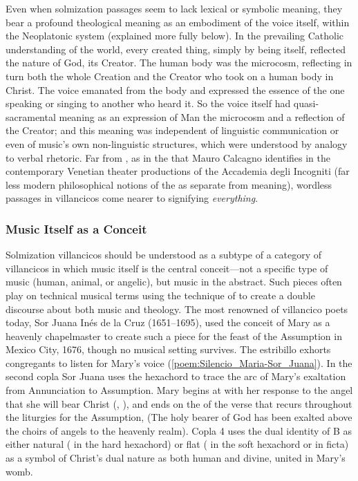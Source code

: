 Even when solmization passages seem to lack lexical or symbolic meaning, they
bear a profound theological meaning as an embodiment of the voice itself,
within the Neoplatonic system (explained more fully below).
In the prevailing Catholic understanding of the world, every created thing,
simply by being itself, reflected the nature of God, its Creator.
The human body was the microcosm, reflecting in turn both the whole Creation
and the Creator who took on a human body in Christ.
The voice emanated from the body and expressed the essence of the one speaking
or singing to another who heard it.
So the voice itself had quasi-sacramental meaning as an expression of Man the
microcosm and a reflection of the Creator; and this meaning was independent of
linguistic communication or even of music's own non-linguistic structures,
which were understood by analogy to verbal rhetoric.
Far from , as in the  that Mauro Calcagno identifies in the contemporary Venetian theater
productions of the Accademia degli Incogniti (far less modern philosophical
notions of the  as separate from meaning), wordless
passages in villancicos come nearer to signifying \emph{everything}.%

\subsubsection{Music Itself as a Conceit}

Solmization villancicos should be understood as a subtype of a category of
villancicos in which music itself is the central conceit---not a specific type
of music (human, animal, or angelic), but music in the abstract.
Such pieces often play on technical musical terms using the technique of
 to create a double discourse about both music and theology.
The most renowned of villancico poets today, Sor Juana Inés de la Cruz
(1651--1695), used the conceit of Mary as a heavenly chapelmaster to create
such a piece for the feast of the Assumption in Mexico City, 1676, though no
musical setting survives.%
    \Autocite[, ]{SorJuana:VC} 
The estribillo exhorts congregants to listen for Mary's voice
(\cref{poem:Silencio_Maria-Sor_Juana}).
In the second copla Sor Juana uses the hexachord to trace the arc of Mary's
exaltation from Annunciation to Assumption. 
Mary begins at  with her response to the angel that she will bear
Christ (, ), and ends on the
 of the verse that recurs throughout the liturgies for the Assumption,
 (The holy bearer of God has been exalted above the choirs of angels to
the heavenly realm).
Copla 4 uses the dual identity of B as either natural ( in the hard
hexachord) or flat ( in the soft hexachord or in ficta) as a symbol of
Christ's dual nature as both human and divine, united in Mary's womb.

